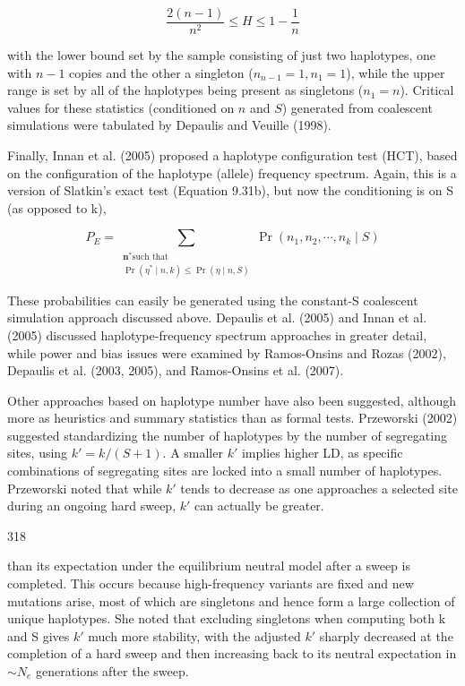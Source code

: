 \documentclass{article}
\begin{document}
\begin{equation}
\frac{2(n-1)}{n^{2}}\leq H\leq1-\frac{1}{n}
\tag{9.34b}
\label{eq:9_34b}
\end{equation}

with the lower bound set by the sample consisting of just two haplotypes, one with $n-1$ copies and the other a singleton ($n_{n-1}=1, n_{1}=1$), while the upper range is set by all of the haplotypes being present as singletons ($n_{1}=n$). Critical values for these statistics (conditioned on $n$ and $S$) generated from coalescent simulations were tabulated by Depaulis and Veuille (1998).

Finally, Innan et al. (2005) proposed a haplotype configuration test (HCT), based on the configuration of the haplotype (allele) frequency spectrum. Again, this is a version of Slatkin's exact test (Equation 9.31b), but now the conditioning is on S (as opposed to k),

\begin{equation}
P_{E}=\sum_{\substack{\boldsymbol{n}^{*}\text{such that}\\ \Pr(\eta^{*}\mid n,k)\leq\Pr(\eta\mid n,S)}}\Pr(n_{1},n_{2},\cdots,n_{k}\mid S)
\tag{9.34c}
\label{eq:9_34c}
\end{equation}

These probabilities can easily be generated using the constant-S coalescent simulation approach discussed above. Depaulis et al. (2005) and Innan et al. (2005) discussed haplotype-frequency spectrum approaches in greater detail, while power and bias issues were examined by Ramos-Onsins and Rozas (2002), Depaulis et al. (2003, 2005), and Ramos-Onsins et al. (2007).

Other approaches based on haplotype number have also been suggested, although more as heuristics and summary statistics than as formal tests. Przeworski (2002) suggested standardizing the number of haplotypes by the number of segregating sites, using  $ k' = k/(S + 1) $. A smaller  $ k' $ implies higher LD, as specific combinations of segregating sites are locked into a small number of haplotypes. Przeworski noted that while  $ k' $ tends to decrease as one approaches a selected site during an ongoing hard sweep,  $ k' $ can actually be greater.

318

than its expectation under the equilibrium neutral model after a sweep is completed. This occurs because high-frequency variants are fixed and new mutations arise, most of which are singletons and hence form a large collection of unique haplotypes. She noted that excluding singletons when computing both k and S gives  $ k' $ much more stability, with the adjusted  $ k' $ sharply decreased at the completion of a hard sweep and then increasing back to its neutral expectation in  $ \sim N_e $ generations after the sweep.
\end{document}
